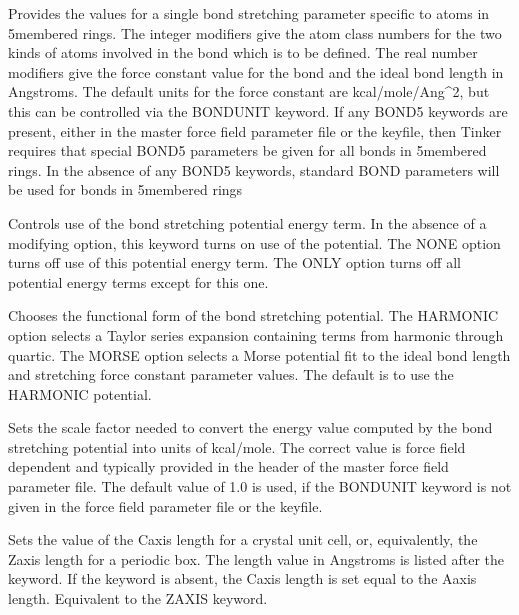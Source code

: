 \documentclass[letterpaper,11pt,english]{sphinxmanual}
\begin{document}
  Provides the values for a single bond stretching parameter specific to atoms in 5\sphinxhyphen{}membered rings. The integer modifiers give the atom class numbers for the two kinds of atoms involved in the bond which is to be defined. The real number modifiers give the force constant value for the bond and the ideal bond length in Angstroms. The default units for the force constant are kcal/mole/Ang\textasciicircum{}2, but this can be controlled via the BONDUNIT keyword. If any BOND5 keywords are present, either in the master force field parameter file or the keyfile, then Tinker requires that special BOND5 parameters be given for all bonds in 5\sphinxhyphen{}membered rings. In the absence of any BOND5 keywords, standard BOND parameters will be used for bonds in 5\sphinxhyphen{}membered rings

  Controls use of the bond stretching potential energy term. In the absence of a modifying option, this keyword turns on use of the potential. The NONE option turns off use of this potential energy term. The ONLY option turns off all potential energy terms except for this one.

  Chooses the functional form of the bond stretching potential. The HARMONIC option selects a Taylor series expansion containing terms from harmonic through quartic. The MORSE option selects a Morse potential fit to the ideal bond length and stretching force constant parameter values. The default is to use the HARMONIC potential.

  Sets the scale factor needed to convert the energy value computed by the bond stretching potential into units of kcal/mole. The correct value is force field dependent and typically provided in the header of the master force field parameter file. The default value of 1.0 is used, if the BONDUNIT keyword is not given in the force field parameter file or the keyfile.


  Sets the value of the C\sphinxhyphen{}axis length for a crystal unit cell, or, equivalently, the Z\sphinxhyphen{}axis length for a periodic box. The length value in Angstroms is listed after the keyword. If the keyword is absent, the C\sphinxhyphen{}axis length is set equal to the A\sphinxhyphen{}axis length. Equivalent to the Z\sphinxhyphen{}AXIS keyword.
\end{document}
